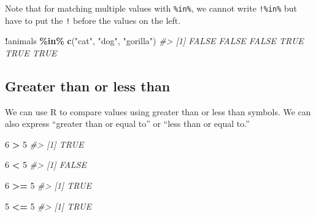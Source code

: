 \documentclass[
  12pt,
]{book}
\newenvironment{Shaded}{\begin{snugshade}}{\end{snugshade}}
\newcommand{\CommentTok}[1]{\textcolor[rgb]{0.37,0.37,0.37}{\textit{#1}}}
\newcommand{\DecValTok}[1]{\textcolor[rgb]{0.06,0.06,0.06}{#1}}
\newcommand{\KeywordTok}[1]{\textcolor[rgb]{0.27,0.27,0.27}{\textbf{#1}}}
\newcommand{\NormalTok}[1]{#1}
\newcommand{\OperatorTok}[1]{\textcolor[rgb]{0.43,0.43,0.43}{\textbf{#1}}}
\newcommand{\StringTok}[1]{\textcolor[rgb]{0.5,0.5,0.5}{#1}}
\begin{document}
Note that for matching multiple values with \texttt{\%in\%}, we cannot write \texttt{!\%in\%} but have to put the \texttt{!} before the values on the left.

\begin{Shaded}
\begin{Highlighting}[]
\OperatorTok{!}\NormalTok{animals }\OperatorTok{\%in\%}\StringTok{ }\KeywordTok{c}\NormalTok{(}\StringTok{"cat"}\NormalTok{, }\StringTok{"dog"}\NormalTok{, }\StringTok{"gorilla"}\NormalTok{)}
\CommentTok{\#\textgreater{} [1] FALSE FALSE FALSE  TRUE  TRUE  TRUE}
\end{Highlighting}
\end{Shaded}

\hypertarget{greater-than-or-less-than}{%
\subsection{Greater than or less than}\label{greater-than-or-less-than}}

We can use R to compare values using greater than or less than symbols. We can also express ``greater than or equal to'' or ``less than or equal to.''

\begin{Shaded}
\begin{Highlighting}[]
\DecValTok{6} \OperatorTok{\textgreater{}}\StringTok{ }\DecValTok{5}
\CommentTok{\#\textgreater{} [1] TRUE}
\end{Highlighting}
\end{Shaded}

\begin{Shaded}
\begin{Highlighting}[]
\DecValTok{6} \OperatorTok{\textless{}}\StringTok{ }\DecValTok{5}
\CommentTok{\#\textgreater{} [1] FALSE}
\end{Highlighting}
\end{Shaded}

\begin{Shaded}
\begin{Highlighting}[]
\DecValTok{6} \OperatorTok{\textgreater{}=}\StringTok{ }\DecValTok{5}
\CommentTok{\#\textgreater{} [1] TRUE}
\end{Highlighting}
\end{Shaded}

\begin{Shaded}
\begin{Highlighting}[]
\DecValTok{5} \OperatorTok{\textless{}=}\StringTok{ }\DecValTok{5}
\CommentTok{\#\textgreater{} [1] TRUE}
\end{Highlighting}
\end{Shaded}
\end{document}
